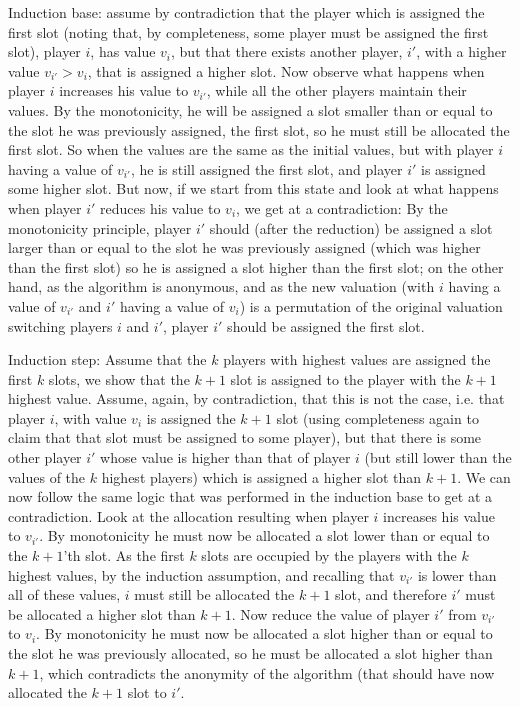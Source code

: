 \documentclass[a4page,notitlepage]{article}
\begin{document}
\begin{enumerate}
\begin{enumerate}
      Induction base: assume by contradiction that the player which is assigned the first slot (noting that, by completeness, some player must be assigned the first slot), player $i$, has value $v_i$, but that there exists another player, $i'$, with a higher value $v_{i'}>v_i$, that is assigned a higher slot.
      Now observe what happens when player $i$ increases his value to $v_{i'}$, while all the other players maintain their values.
      By the monotonicity, he will be assigned a slot smaller than or equal to the slot he was previously assigned, the first slot, so he must still be allocated the first slot.
      So when the values are the same as the initial values, but with player $i$ having a value of $v_{i'}$, he is still assigned the first slot, and player $i'$ is assigned some higher slot.
      But now, if we start from this state and look at what happens when player $i'$ reduces his value to $v_i$, we get at a contradiction:
      By the monotonicity principle, player $i'$ should (after the reduction) be assigned a slot larger than or equal to the slot he was previously assigned (which was higher than the first slot) so he is assigned a slot higher than the first slot; on the other hand, as the algorithm is anonymous, and as the new valuation (with $i$ having a value of $v_{i'}$ and $i'$ having a value of $v_i$) is a permutation of the original valuation switching players $i$ and $i'$, player $i'$ should be assigned the first slot.

      Induction step:
      Assume that the $k$ players with highest values are assigned the first $k$ slots, we show that the $k+1$ slot is assigned to the player with the $k+1$ highest value.
      Assume, again, by contradiction, that this is not the case, i.e. that player $i$, with value $v_i$ is assigned the $k+1$ slot (using completeness again to claim that that slot must be assigned to some player), but that there is some other player $i'$ whose value is higher than that of player $i$ (but still lower than the values of the $k$ highest players) which is assigned a higher slot than $k+1$.
      We can now follow the same logic that was performed in the induction base to get at a contradiction.
      Look at the allocation resulting when player $i$ increases his value to $v_{i'}$.
      By monotonicity he must now be allocated a slot lower than or equal to the $k+1$'th slot.
      As the first $k$ slots are occupied by the players with the $k$ highest values, by the induction assumption, and recalling that $v_{i'}$ is lower than all of these values, $i$ must still be allocated the $k+1$ slot, and therefore $i'$ must be allocated a higher slot than $k+1$.
      Now reduce the value of player $i'$ from $v_{i'}$ to $v_i$.
      By monotonicity he must now be allocated a slot higher than or equal to the slot he was previously allocated, so he must be allocated a slot higher than $k+1$, which contradicts the anonymity of the algorithm (that should have now allocated the $k+1$ slot to $i'$.
      

\end{enumerate}
\end{enumerate}
\end{document}
